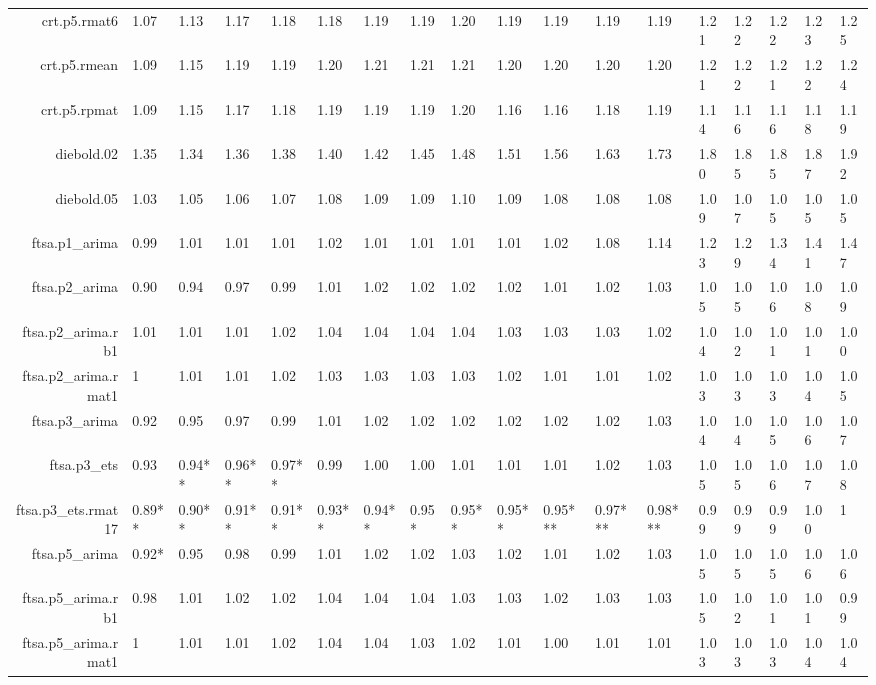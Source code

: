 \begin{table}[ht]
{\begin{tabular}{rlllllllllllllllll}
  crt.p5.rmat6 & 1.07 & 1.13 & 1.17 & 1.18 & 1.18 & 1.19 & 1.19 & 1.20 & 1.19 & 1.19 & 1.19 & 1.19 & 1.21 & 1.22 & 1.22 & 1.23 & 1.25 \\ 
  crt.p5.rmean & 1.09 & 1.15 & 1.19 & 1.19 & 1.20 & 1.21 & 1.21 & 1.21 & 1.20 & 1.20 & 1.20 & 1.20 & 1.21 & 1.22 & 1.21 & 1.22 & 1.24 \\ 
  crt.p5.rpmat & 1.09 & 1.15 & 1.17 & 1.18 & 1.19 & 1.19 & 1.19 & 1.20 & 1.16 & 1.16 & 1.18 & 1.19 & 1.14 & 1.16 & 1.16 & 1.18 & 1.19 \\ 
  diebold.02 & 1.35 & 1.34 & 1.36 & 1.38 & 1.40 & 1.42 & 1.45 & 1.48 & 1.51 & 1.56 & 1.63 & 1.73 & 1.80 & 1.85 & 1.85 & 1.87 & 1.92 \\ 
  diebold.05 & 1.03 & 1.05 & 1.06 & 1.07 & 1.08 & 1.09 & 1.09 & 1.10 & 1.09 & 1.08 & 1.08 & 1.08 & 1.09 & 1.07 & 1.05 & 1.05 & 1.05 \\ 
  ftsa.p1\_arima & 0.99 & 1.01 & 1.01 & 1.01 & 1.02 & 1.01 & 1.01 & 1.01 & 1.01 & 1.02 & 1.08 & 1.14 & 1.23 & 1.29 & 1.34 & 1.41 & 1.47 \\ 
  ftsa.p2\_arima & 0.90 & 0.94 & 0.97 & 0.99 & 1.01 & 1.02 & 1.02 & 1.02 & 1.02 & 1.01 & 1.02 & 1.03 & 1.05 & 1.05 & 1.06 & 1.08 & 1.09 \\ 
  ftsa.p2\_arima.rb1 & 1.01 & 1.01 & 1.01 & 1.02 & 1.04 & 1.04 & 1.04 & 1.04 & 1.03 & 1.03 & 1.03 & 1.02 & 1.04 & 1.02 & 1.01 & 1.01 & 1.00 \\ 
  ftsa.p2\_arima.rmat1 & 1 & 1.01 & 1.01 & 1.02 & 1.03 & 1.03 & 1.03 & 1.03 & 1.02 & 1.01 & 1.01 & 1.02 & 1.03 & 1.03 & 1.03 & 1.04 & 1.05 \\ 
  ftsa.p3\_arima & 0.92 & 0.95 & 0.97 & 0.99 & 1.01 & 1.02 & 1.02 & 1.02 & 1.02 & 1.02 & 1.02 & 1.03 & 1.04 & 1.04 & 1.05 & 1.06 & 1.07 \\ 
  ftsa.p3\_ets & 0.93 & 0.94** & 0.96** & 0.97** & 0.99 & 1.00 & 1.00 & 1.01 & 1.01 & 1.01 & 1.02 & 1.03 & 1.05 & 1.05 & 1.06 & 1.07 & 1.08 \\ 
  ftsa.p3\_ets.rmat17 & 0.89** & 0.90** & 0.91** & 0.91** & 0.93** & 0.94** & 0.95* & 0.95** & 0.95** & 0.95*** & 0.97*** & 0.98*** & 0.99 & 0.99 & 0.99 & 1.00 & 1 \\ 
  ftsa.p5\_arima & 0.92* & 0.95 & 0.98 & 0.99 & 1.01 & 1.02 & 1.02 & 1.03 & 1.02 & 1.01 & 1.02 & 1.03 & 1.05 & 1.05 & 1.05 & 1.06 & 1.06 \\ 
  ftsa.p5\_arima.rb1 & 0.98 & 1.01 & 1.02 & 1.02 & 1.04 & 1.04 & 1.04 & 1.03 & 1.03 & 1.02 & 1.03 & 1.03 & 1.05 & 1.02 & 1.01 & 1.01 & 0.99 \\ 
  ftsa.p5\_arima.rmat1 & 1 & 1.01 & 1.01 & 1.02 & 1.04 & 1.04 & 1.03 & 1.02 & 1.01 & 1.00 & 1.01 & 1.01 & 1.03 & 1.03 & 1.03 & 1.04 & 1.04 \\ 

\end{tabular}}
\end{table}
